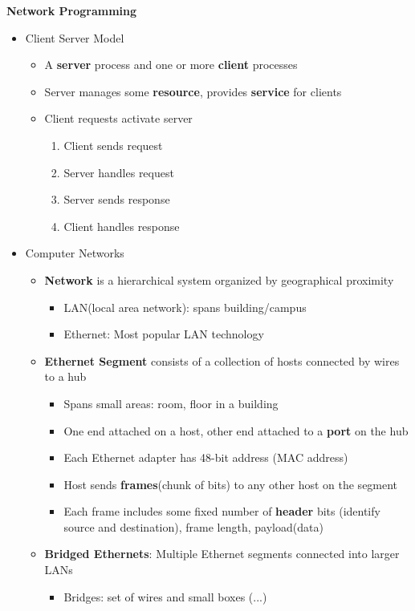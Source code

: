\documentclass[12pt]{article}
\newcommand{\cname}[1]{\large \textbf{#1}}
\begin{document}
{\cname{Network Programming}
\begin{itemize}
	\item Client Server Model
	\begin{itemize}
		\item A \textbf{server} process and one or more \textbf{client} processes
		\item Server manages some \textbf{resource}, provides \textbf{service} for clients
		\item Client requests activate server
		\begin{enumerate}
			\item Client sends request
			\item Server handles request
			\item Server sends response
			\item Client handles response
		\end{enumerate}
	\end{itemize}
	\item Computer Networks
	\begin{itemize}
		\item \textbf{Network} is a hierarchical system organized by geographical proximity
		\begin{itemize}
			\item LAN(local area network): spans building/campus
			\item Ethernet: Most popular LAN technology
		\end{itemize}
		\item \textbf{Ethernet Segment} consists of a collection of hosts connected by wires to a hub
		\begin{itemize}
			\item Spans small areas: room, floor in a building
			\item One end attached on a host, other end attached to a \textbf{port} on the hub
			\item Each Ethernet adapter has 48-bit address (MAC address)
			\item Host sends \textbf{frames}(chunk of bits) to any other host on the segment
			\item Each frame includes some fixed number of \textbf{header} bits (identify source and destination), frame length, payload(data)
		\end{itemize}
		\item \textbf{Bridged Ethernets}: Multiple Ethernet segments connected into larger LANs
		\begin{itemize}
			\item Bridges: set of wires and small boxes (...)

\end{itemize}
\end{itemize}
\end{itemize}}
\end{document}
